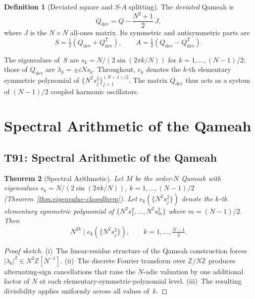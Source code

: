 \documentclass[aip,jmp,reprint,superscriptaddress,floatfix,nofootinbib]{revtex4-2}
\newtheorem{theorem}{Theorem}
\theoremstyle{definition}
\newtheorem{definition}[theorem]{Definition}
\theoremstyle{remark}
\begin{document}
\begin{definition}[Deviated square and $S$-$A$ splitting]
\label{def:deviation}
The \emph{deviated} Qameah is
\[
Q_{\mathrm{dev}} = Q - \frac{N^2+1}{2}\,J,
\]
where $J$ is the $N{\times}N$ all-ones matrix.
Its symmetric and antisymmetric parts are
\[
S = \tfrac{1}{2}(Q_{\mathrm{dev}} + Q_{\mathrm{dev}}^T), \qquad
A = \tfrac{1}{2}(Q_{\mathrm{dev}} - Q_{\mathrm{dev}}^T).
\]
\end{definition}

The eigenvalues of~$S$ are $s_k = N/(2\sin(2\pi k/N))$ for
$k=1,\ldots,(N{-}1)/2$; those of $Q_{\mathrm{dev}}$ are
$\lambda_k = \pm iNs_k$.  Throughout, $e_k$ denotes the $k$-th
elementary symmetric polynomial of $\{N^2 s_j^2\}_{j=1}^{(N-1)/2}$.
The matrix $Q_{\mathrm{dev}}$ thus acts as a system of $(N-1)/2$
coupled harmonic oscillators.

\section{Spectral Arithmetic of the Qameah}
\label{sec:spectral-qameah}

\subsection{T91: Spectral Arithmetic of the Qameah}
\label{sec:t91-spectral-arithmetic}

\begin{theorem}[Spectral Arithmetic]
\label{thm:t91}
Let $M$ be the order-$N$ Qameah with eigenvalues
$s_k = N/(2\sin(2\pi k/N))$, $k = 1,\ldots,(N-1)/2$
(Theorem~\ref{thm:eigenvalue-closedform}).
Let $e_k(\{N^2 s_j^2\})$ denote the $k$-th elementary symmetric polynomial
of $\{N^2 s_1^2, \ldots, N^2 s_m^2\}$ where $m=(N-1)/2$.  Then
\[
N^{2k} \mid e_k(\{N^2 s_j^2\}), \qquad k = 1,\ldots,\tfrac{N-1}{2}.
\]
\end{theorem}

\begin{proof}[Proof sketch]
(i)~The linear-residue structure of the Qameah construction forces
$|\lambda_k|^2 \in N^2\mathbb{Z}[N^{-1}]$.
(ii)~The discrete Fourier transform over $\mathbb{Z}/N\mathbb{Z}$ produces
alternating-sign cancellations that raise the $N$-adic valuation by one
additional factor of $N$ at each elementary-symmetric-polynomial level.
(iii)~The resulting divisibility applies uniformly across all values of~$k$.
\end{proof}
\end{document}
